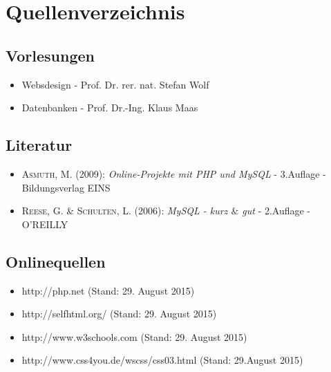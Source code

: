 \newpage
\section{Quellenverzeichnis}

\subsection*{Vorlesungen}
\begin{itemize}
	\item Websdesign - Prof. Dr. rer. nat. Stefan Wolf
	\item Datenbanken - Prof. Dr.-Ing. Klaus Maas  
\end{itemize}

\subsection*{Literatur}
\begin{itemize}
	\item \textsc{Asmuth, M.} (2009): \textit{Online-Projekte mit PHP und MySQL} -  3.Auflage - \\ Bildungsverlag EINS
	\item \textsc{Reese, G. \&  Schulten, L.} (2006): \textit{MySQL - kurz $\&$ gut} -  2.Auflage - O'REILLY
\end{itemize}

\subsection*{Onlinequellen}
\begin{itemize}
	\item http://php.net (Stand: 29. August 2015)
	\item http://selfhtml.org/ (Stand: 29. August 2015)
	\item http://www.w3schools.com (Stand: 29. August 2015)
	\item http://www.css4you.de/wscss/css03.html (Stand: 29.August 2015)
\end{itemize}